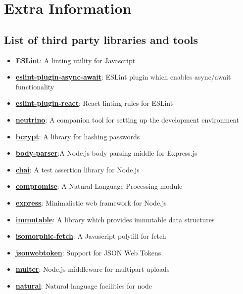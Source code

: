 \chapter{Extra Information}

\section{List of third party libraries and tools}
\label{thirdparty}

\begin{itemize}
\item \href{http://eslint.org/}{\textbf{ESLint}}: A linting utility for Javascript
\item \href{https://github.com/59naga/eslint-plugin-async-await}{\textbf{eslint-plugin-async-await}}: ESLint plugin which enables async/await functionality
\item \href{https://github.com/yannickcr/eslint-plugin-react}{\textbf{eslint-plugin-react}}: React linting rules for ESLint
\item \href{https://github.com/mozilla-neutrino/neutrino-dev}{\textbf{neutrino}}: A companion tool for setting up the development  environment
  \item \href{https://github.com/kelektiv/node.bcrypt.js}{\textbf{bcrypt}}: A library for hashing passwords
  \item \href{https://github.com/expressjs/body-parser}{\textbf{body-parser}}:A Node.js body parsing middle for Express.js
  \item \href{http://chaijs.com/}{\textbf{chai}}: A test assertion library for Node.js
  \item \href{https://github.com/nlp-compromise/compromise}{\textbf{compromise}}: A Natural Language Processing module
  \item \href{https://expressjs.com/}{\textbf{express}}: Minimalistic web framework for Node.js
  \item \href{https://facebook.github.io/immutable-js/}{\textbf{immutable}}:  A library which provides immutable data structures
  \item \href{https://github.com/matthew-andrews/isomorphic-fetch}{\textbf{isomorphic-fetch}}: A Javascript polyfill for fetch
  \item \href{https://jwt.io/}{\textbf{jsonwebtoken}}: Support for JSON Web Tokens
  \item \href{https://github.com/expressjs/multer}{\textbf{multer}}: Node.js middleware for multipart uploads
  \item \href{https://github.com/NaturalNode/natural}{\textbf{natural}}: Natural language facilities for node

\end{itemize}
